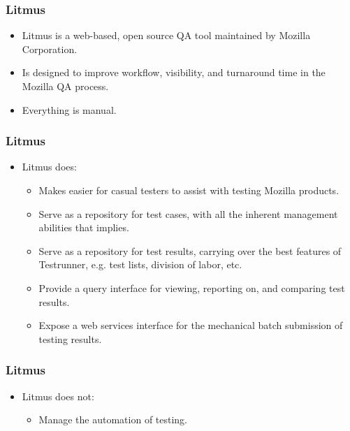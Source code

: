 \documentclass{beamer}
\begin{document}


\begin{frame}
\frametitle{Litmus}
 \begin{itemize}
    \item Litmus is a web-based, open source QA tool maintained by Mozilla Corporation.
    \item Is designed to improve workflow, visibility, and turnaround time in the Mozilla QA process.
    \item Everything is manual.
 \end{itemize}

\end{frame}

\begin{frame}
\frametitle{Litmus}
 \begin{itemize}
    \item Litmus does:
       \begin{itemize}
       \item Makes easier for casual testers to assist with testing Mozilla products.
       \item Serve as a repository for test cases, with all the inherent management abilities that implies.
       \item Serve as a repository for test results, carrying over the best features of Testrunner, e.g. test lists, division of labor, etc.
       \item Provide a query interface for viewing, reporting on, and comparing test results.
       \item Expose a web services interface for the mechanical batch submission of testing results.
       \end{itemize}
 \end{itemize}
\end{frame}


\begin{frame}
\frametitle{Litmus}
 \begin{itemize}
    \item Litmus does not:
       \begin{itemize}
       \item Manage the automation of testing.
       \end{itemize}
 \end{itemize}

\end{frame}
\end{document}
